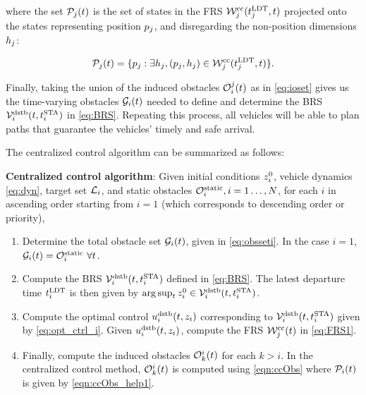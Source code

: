 \noindent where the set $\mathcal{P}_j(t)$ is the set of states in the FRS $\mathcal{W}_j^\text{cc}(t^\text{LDT}_j, t)$ projected onto the states representing position $p_j$, and disregarding the non-position dimensions $h_j$:

\begin{equation} \label{eqn:ccObs_help1}
\pfrs_j(t) = \{p_j: \exists \npos_j, (p_j, \npos_j) \in \frs_j^\text{cc}(\ldt_j, t)\}.
\end{equation}

Finally, taking the union of the induced obstacles $\mathcal{O}_i^j(t)$ as in \eqref{eq:ioset} gives us the time-varying obstacles $\mathcal{G}_i(t)$ needed to define and determine the BRS $\mathcal{V}_i^\text{dstb}(t, t^\text{STA}_i)$ in \eqref{eq:BRS}. Repeating this process, all vehicles will be able to plan paths that guarantee the vehicles' timely and safe arrival.

The centralized control algorithm can be summarized as follows:
\begin{alg}
\label{alg:cc}
\textbf{Centralized control algorithm}: Given initial conditions $z_i^0$, vehicle dynamics \eqref{eq:dyn}, target set $\mathcal{L}_i$, and static obstacles $\mathcal{O}^\text{static}_i, i = 1\ldots, N$, for each $i$ in ascending order starting from $i=1$ (which corresponds to descending order or priority),
\begin{enumerate}
\item Determine the total obstacle set $\mathcal{G}_i(t)$, given in \eqref{eq:obsseti}. In the case $i=1$, $\mathcal{G}_i(t) = \mathcal{O}^\text{static}_i ~ \forall t$.
\item Compute the BRS $\mathcal{V}_i^\text{dstb}(t,t^\text{STA}_i)$ defined in \eqref{eq:BRS}. The latest departure time $t^\text{LDT}_i$ is then given by $\arg \sup_t z^0_i \in \mathcal{V}_i^\text{dstb}(t, t^\text{STA}_i)$.
\item Compute the optimal control $u_i^\text{dstb}(t,z_i)$ corresponding to $\mathcal{V}_i^\text{dstb}(t, t^\text{STA}_i)$ given by \eqref{eq:opt_ctrl_i}. Given $u_i^\text{dstb}(t,z_i)$, compute the FRS $\mathcal{W}_j^\text{cc}(t)$ in \eqref{eq:FRS1}.
\item Finally, compute the induced obstacles $\mathcal{O}_k^i(t)$ for each $k>i$. In the centralized control method, $\mathcal{O}_k^i(t)$ is computed using \eqref{eqn:ccObs} where $\mathcal{P}_i(t)$ is given by \eqref{eqn:ccObs_help1}.
\end{enumerate}
\end{alg}